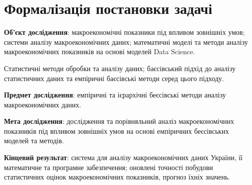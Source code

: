 \section{Формалізація постановки задачі}


\textbf{Об’єкт дослідження}: макроекономічні показники під впливом зовнішніх умов; системи аналізу макроекономічних даних; математичні моделі та методи аналізу макроекономічних показників на основі моделей Data Science.

Статистичні методи обробки та аналізу даних; баєсівський підхід до аналізу статистичних даних та емпіричні баєсівські методи серед цього підходу.


\textbf{Предмет дослідження}: емпіричні та ієрархічні беєсівські методи аналізу макроекономічних даних. 


\textbf{Мета дослідження}: дослідження  та  порівняльний  аналіз  макроекономічних показників під впливом зовнішніх умов на основі емпіричних беєсівських моделей та методів.


\textbf{Кінцевий результат}: система для аналізу макроекономічних даних України, її математичне та програмне забезпечення; оновлені точності побудови статистичних оцінок макроекономічних показників, прогноз їхніх значень.